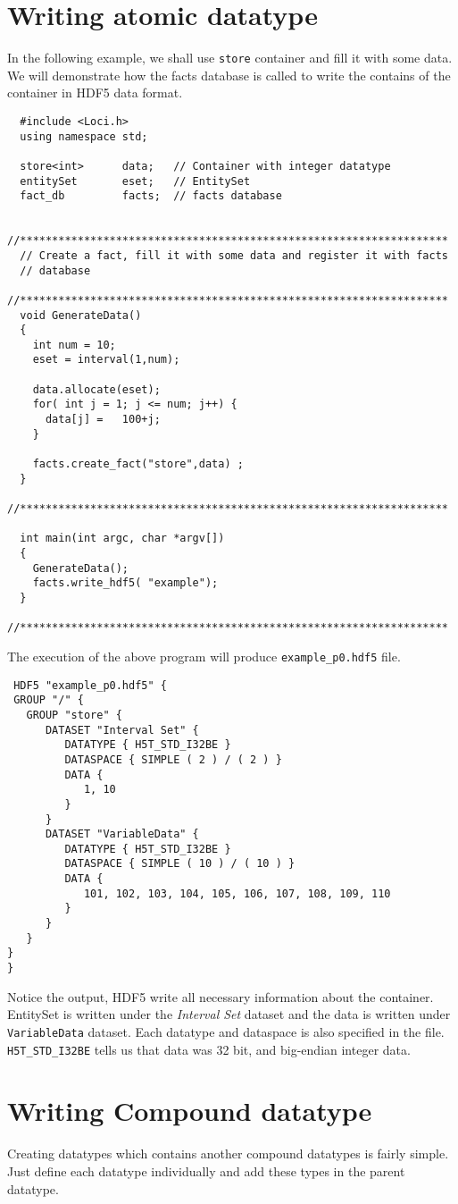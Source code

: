 \section { Writing atomic datatype }
In the following example, we shall use {\tt store} container and fill it with
some data. We will demonstrate how the facts database is called to write the
contains of the container in HDF5 data format.
\begin{verbatim}
  #include <Loci.h>
  using namespace std;
 
  store<int>      data;   // Container with integer datatype
  entitySet       eset;   // EntitySet
  fact_db         facts;  // facts database

  //*******************************************************************
  // Create a fact, fill it with some data and register it with facts
  // database
  //*******************************************************************
  void GenerateData()
  {
    int num = 10;
    eset = interval(1,num);

    data.allocate(eset);
    for( int j = 1; j <= num; j++) {
      data[j] =   100+j;
    }

    facts.create_fact("store",data) ;
  }
  //*******************************************************************

  int main(int argc, char *argv[])
  {
    GenerateData();
    facts.write_hdf5( "example");
  }
  //*******************************************************************
\end{verbatim}
The execution of the above program will produce {\tt example\_p0.hdf5} file. 
\begin{verbatim}
 HDF5 "example_p0.hdf5" {
 GROUP "/" {
   GROUP "store" {
      DATASET "Interval Set" {
         DATATYPE { H5T_STD_I32BE }
         DATASPACE { SIMPLE ( 2 ) / ( 2 ) }
         DATA {
            1, 10
         }
      }
      DATASET "VariableData" {
         DATATYPE { H5T_STD_I32BE }
         DATASPACE { SIMPLE ( 10 ) / ( 10 ) }
         DATA {
            101, 102, 103, 104, 105, 106, 107, 108, 109, 110
         }
      }
   }
}
}
\end{verbatim}
\par Notice the output, HDF5 write all necessary information about the container. EntitySet is 
written under the {\em Interval Set} dataset and the data is written under {\tt VariableData}
dataset. Each datatype and dataspace is also specified in the file. {\tt H5T\_STD\_I32BE} tells
us that data was 32 bit, and big-endian integer data.
%
\section { Writing Compound datatype}
Creating datatypes which contains another compound datatypes is fairly
simple. Just define each datatype individually and add these types in 
the parent datatype.

